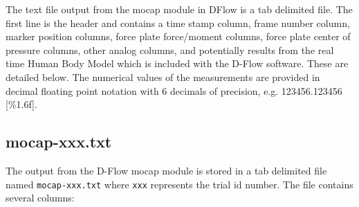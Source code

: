 \documentclass[10pt,a4paper,twocolumn]{article}
\begin{document}
The text file output from the mocap module in DFlow is a tab delimited file.
The first line is the header and contains a time stamp column, frame number
column, marker position columns, force plate force/moment columns, force plate
center of pressure columns, other analog columns, and potentially results from
the real time Human Body Model \cite{Bogert2013} which is included with the
D-Flow software. These are detailed below. The numerical values of the
measurements are provided in decimal floating point notation with 6 decimals of
precision, e.g. 123456.123456 [\%1.6f].

\subsection*{mocap-xxx.txt}

The output from the D-Flow mocap module is stored in a tab delimited file named
\verb+mocap-xxx.txt+ where \verb+xxx+ represents the trial id number. The file
contains several columns:
\end{document}

